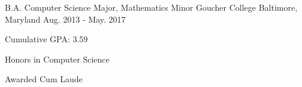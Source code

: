 

\begin{cventries}

  \cventry
    {B.A. Computer Science Major, Mathematics Minor} %
    {Goucher College} %
    {Baltimore, Maryland} %
    {Aug. 2013 - May. 2017} %
    {
      \begin{cvitems} %
        \item {Cumulative GPA: 3.59}
        \item {Honors in Computer Science}
        \item {Awarded Cum Laude}
      \end{cvitems}
    }

\end{cventries}
